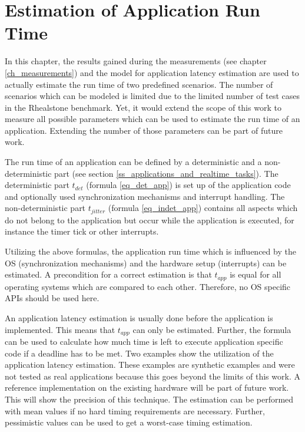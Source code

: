 \chapter{Estimation of Application Run Time}\label{ch_estimation_of_application_run_time}
In this chapter, the results gained during the measurements (see chapter \ref{ch_measurements}) and the model for application latency estimation are used to actually estimate the run time of two predefined scenarios.
The number of scenarios which can be modeled is limited due to the limited number of test cases in the Rhealstone benchmark.
Yet, it would extend the scope of this work to measure all possible parameters which can be used to estimate the run time of an application.
Extending the number of those parameters can be part of future work.
\par
The run time of an application can be defined by a deterministic and a non-deterministic part (see section \ref{ss_applications_and_realtime_tasks}). 
The deterministic part $t_{det}$ (formula \ref{eq_det_app}) is set up of the application code and optionally used synchronization mechanisms and interrupt handling.
The non-deterministic part $t_{jitter}$ (formula \ref{eq_indet_app}) contains all aspects which do not belong to the application but occur while the application is executed, for instance the timer tick or other interrupts.  
\par
Utilizing the above formulas, the application run time which is influenced by the \ac{OS} (synchronization mechanisms) and the hardware setup (interrupts) can be estimated. 
A precondition for a correct estimation is that $t_{app}$ is equal for all operating systems which are compared to each other. 
Therefore, no \ac{OS} specific \acp{API} should be used here.
\par
An application latency estimation is usually done before the application is implemented. 
This means that $t_{app}$ can only be estimated. 
Further, the formula can be used to calculate how much time is left to execute application specific code if a deadline has to be met. 
Two examples show the utilization of the application latency estimation.
These examples are synthetic examples and were not tested as real applications because this goes beyond the limits of this work.
A reference implementation on the existing hardware will be part of future work.
This will show the precision of this technique.
The estimation can be performed with mean values if no hard timing requirements are necessary. 
Further, pessimistic values can be used to get a worst-case timing estimation.

